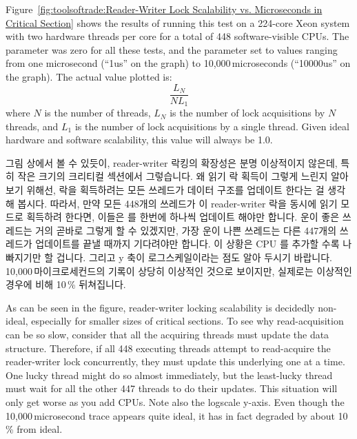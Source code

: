 Figure~\ref{fig:toolsoftrade:Reader-Writer Lock Scalability vs. Microseconds in Critical Section}
shows the results of running this test on a 224-core Xeon system
with two hardware threads per core for a total of 448 software-visible
CPUs.
The  parameter was zero for all these tests, and the
 parameter set to values ranging from one microsecond (``1us''
on the graph) to 10,000\,microseconds (``10000us'' on the graph).
The actual value plotted is:
\begin{equation}
	\frac{L_N}{N L_1}
\end{equation}
where $N$ is the number of threads,
$L_N$ is the number of lock acquisitions by $N$ threads, and
$L_1$ is the number of lock acquisitions by a single thread.
Given ideal hardware and software scalability, this value will always
be 1.0.

\fi

그림 상에서 볼 수 있듯이, reader-writer 락킹의 확장성은 분명 이상적이지 않은데,
특히 작은 크기의 크리티컬 섹션에서 그렇습니다.
왜 읽기 락 획득이 그렇게 느린지 알아보기 위해선, 락을 획득하려는 모든 쓰레드가
 데이터 구조를 업데이트 한다는 걸 생각해 봅시다.
따라서, 만약 모든 448개의 쓰레드가 이 reader-writer 락을 동시에 읽기 모드로
획득하려 한다면, 이들은  를 한번에 하나씩 업데이트 해야만
합니다.
운이 좋은 쓰레드는 거의 곧바로 그렇게 할 수 있겠지만, 가장 운이 나쁜 쓰레드는
다른 447개의 쓰레드가 업데이트를 끝낼 때까지 기다려야만 합니다.
이 상황은 CPU 를 추가할 수록 나빠지기만 할 겁니다.
그리고 y 축이 로그스케일이라는 점도 알아 두시기 바랍니다.
10,000\,마이크로세컨드의 기록이 상당히 이상적인 것으로 보이지만, 실제로는
이상적인 경우에 비해 10\,\% 뒤쳐집니다.

\iffalse

As can be seen in the figure, reader-writer locking scalability is
decidedly non-ideal, especially for smaller sizes of critical
sections.
To see why read-acquisition can be so slow, consider
that all the acquiring threads must update the 
data structure.
Therefore, if all 448 executing threads attempt to
read-acquire the reader-writer lock concurrently, they must update
this underlying  one at a time.
One lucky thread might do so almost immediately, but the least-lucky
thread must wait for all the other 447 threads to do their updates.
This situation will only get worse as you add CPUs.
Note also the logscale y-axis.
Even though the 10,000\,microsecond trace appears quite ideal, it has
in fact degraded by about 10\,\% from ideal.

